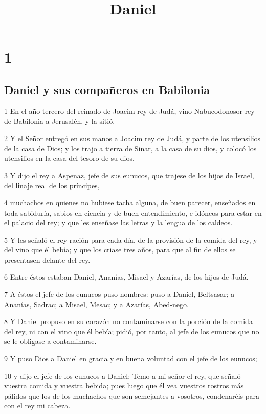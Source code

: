

\title{Daniel}

\chapter{1}

\section*{Daniel y sus compañeros en Babilonia}

\par 1 En el año tercero del reinado de Joacim rey de Judá, vino Nabucodonosor rey de Babilonia a Jerusalén, y la sitió. 
\par 2 Y el Señor entregó en sus manos a Joacim rey de Judá, y parte de los utensilios de la casa de Dios; y los trajo a tierra de Sinar, a la casa de su dios, y colocó los utensilios en la casa del tesoro de su dios.
\par 3 Y dijo el rey a Aspenaz, jefe de sus eunucos, que trajese de los hijos de Israel, del linaje real de los príncipes,
\par 4 muchachos en quienes no hubiese tacha alguna, de buen parecer, enseñados en toda sabiduría, sabios en ciencia y de buen entendimiento, e idóneos para estar en el palacio del rey; y que les enseñase las letras y la lengua de los caldeos. 
\par 5 Y les señaló el rey ración para cada día, de la provisión de la comida del rey, y del vino que él bebía; y que los criase tres años, para que al fin de ellos se presentasen delante del rey.
\par 6 Entre éstos estaban Daniel, Ananías, Misael y Azarías, de los hijos de Judá.
\par 7 A éstos el jefe de los eunucos puso nombres: puso a Daniel, Beltsasar; a Ananías, Sadrac; a Misael, Mesac; y a Azarías, Abed-nego.
\par 8 Y Daniel propuso en su corazón no contaminarse con la porción de la comida del rey, ni con el vino que él bebía; pidió, por tanto, al jefe de los eunucos que no se le obligase a contaminarse.
\par 9 Y puso Dios a Daniel en gracia y en buena voluntad con el jefe de los eunucos;
\par 10 y dijo el jefe de los eunucos a Daniel: Temo a mi señor el rey, que señaló vuestra comida y vuestra bebida; pues luego que él vea vuestros rostros más pálidos que los de los muchachos que son semejantes a vosotros, condenaréis para con el rey mi cabeza.
